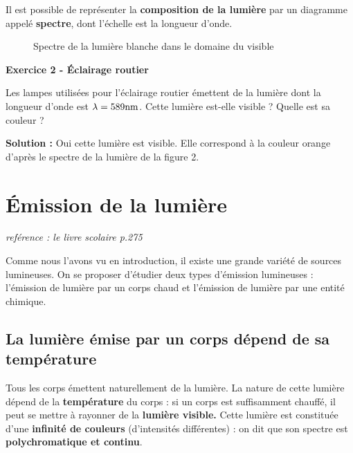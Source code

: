 \documentclass[french, a4paper, 12pt]{article}
\newcommand{\exo}[3]{
	\begin{mdframed}[style=exo, leftmargin=0pt, rightmargin=0pt, innertopmargin=8pt, innerbottommargin=8pt, innerrightmargin=10pt, innerleftmargin=10pt]

		\noindent \textbf{Exercice #1 - #2}\medskip

		#3
	\end{mdframed}
}
\begin{document}
Il est possible de représenter la \textbf{composition de la lumière} par un diagramme appelé \textbf{spectre}, dont l'échelle est la longueur d'onde.

\begin{figure}[ht]
	\centering
	\pgfspectra[width=.9\textwidth, height = 2cm, axis,axis step = 20, begin = 380, end = 780,axis font= \footnotesize, axis color=black!0, axis font color=black, axis label text ={$\lambda$ (nm)} ]%
	\caption{Spectre de la lumière blanche dans le domaine du visible}
\end{figure}

\exo{2}{Éclairage routier}{Les lampes utilisées pour l'éclairage routier émettent de la lumière dont la longueur d'onde est $\lambda = 589 \rm nm$. Cette lumière est-elle visible ? Quelle est sa couleur ? \bigskip

\textbf{Solution : } Oui cette lumière est visible. Elle correspond à la couleur orange d'après le spectre de la lumière de la figure 2.


}


\section{Émission de la lumière}
\begin{center}
\textit{reférence : le livre scolaire p.275}
\end{center}

Comme nous l'avons vu en introduction, il existe une grande variété de sources lumineuses. On se proposer d'étudier deux types d'émission lumineuses : l'émission de lumière par un corps chaud et l'émission de lumière par une entité chimique.

\subsection{La lumière émise par un corps dépend de sa température}

Tous les corps émettent naturellement de la lumière. La nature de cette lumière dépend de la \textbf{température} du corps : si un corps est suffisamment chauffé, il peut se mettre à rayonner de la \textbf{lumière visible.} Cette lumière est constituée d'une \textbf{infinité de couleurs} (d'intensités différentes) : on dit que son spectre est \textbf{polychromatique et continu}.
\end{document}
